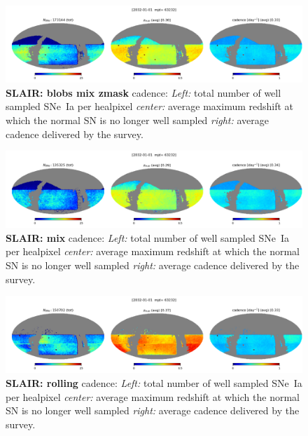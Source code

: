 \begin{figure}[h!]
  \begin{center}
    \includegraphics[width=\linewidth]{Figures/blobs_mix_zmask10yrs_64_maps.png}
    \caption{{\bf SLAIR: blobs mix zmask} cadence: {\em Left:} total number of well
      sampled SNe~Ia per healpixel {\em center:} average maximum
      redshift at which the normal SN is no longer well sampled {\em
        right:} average cadence delivered by the survey.}
  \end{center}
\end{figure}

\begin{figure}[h!]
  \begin{center}
    \includegraphics[width=\linewidth]{Figures/cadence_mix_10yrs_64_maps.png}
    \caption{{\bf SLAIR: mix} cadence: {\em Left:} total number of well
      sampled SNe~Ia per healpixel {\em center:} average maximum
      redshift at which the normal SN is no longer well sampled {\em
        right:} average cadence delivered by the survey.}
  \end{center}
\end{figure}

\begin{figure}[h!]
  \begin{center}
    \includegraphics[width=\linewidth]{Figures/rolling_10yrs_64_maps.png}
    \caption{{\bf SLAIR: rolling} cadence: {\em Left:} total number of well
      sampled SNe~Ia per healpixel {\em center:} average maximum
      redshift at which the normal SN is no longer well sampled {\em
        right:} average cadence delivered by the survey.}
  \end{center}
\end{figure}

